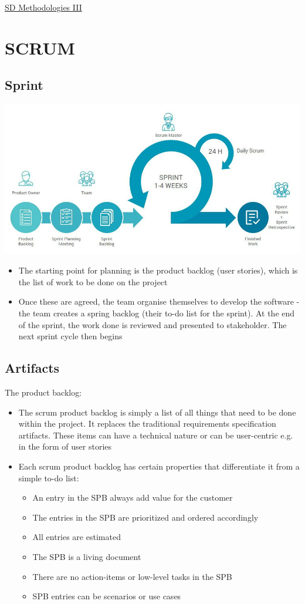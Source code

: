 \documentclass{article}[18pt]
\begin{document}
\begin{center}
\underline{\huge SD Methodologies III}
\end{center}
\section{SCRUM}
\subsection{Sprint}
\begin{center}
	\includegraphics[scale=0.7]{sprint}
\end{center}
\begin{itemize}
	\item The starting point for planning is the product backlog (user stories), which is the list of work to be done on the project
	\item Once these are agreed, the team organise themselves to develop the software - the team creates a spring backlog (their to-do list for the sprint). At the end of the sprint, the work done is reviewed and presented to stakeholder. The next sprint cycle then begins
\end{itemize}
\subsection{Artifacts}
The product backlog:
\begin{itemize}
	\item The scrum product backlog is simply a list of all things that need to be done within the project. It replaces the traditional requirements specification artifacts. These items can have a technical nature or can be user-centric e.g. in the form of user stories
	\item Each scrum product backlog has certain properties that differentiate it from a simple to-do list:
	\begin{itemize}
		\item An entry in the SPB always add value for the customer
		\item The entries in the SPB are prioritized and ordered accordingly
		\item All entries are estimated
		\item The SPB is a living document
		\item There are no action-items or low-level tasks in the SPB
		\item SPB entries can be scenarios or use cases
	\end{itemize}
\end{itemize}
\end{document}
